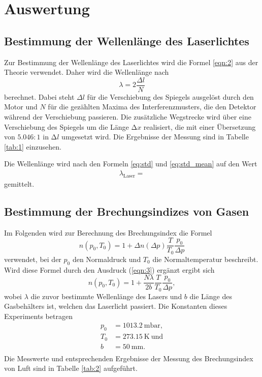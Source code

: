 \section{Auswertung}
\label{sec:Auswertung}

\subsection{Bestimmung der Wellenlänge des Laserlichtes}

Zur Bestimmung der Wellenlänge des Laserlichtes wird die Formel \ref{eqn:2} aus der Theorie verwendet.
Daher wird die Wellenlänge nach
\begin{equation}
  \lambda = 2\frac{\Delta l}{N}
\end{equation}
berechnet.
Dabei steht $\Delta l$ für die Verschiebung des Spiegels ausgelöst durch den Motor und $N$ für die gezählten Maxima des Interferenzmusters, die den Detektor während der Verschiebung passieren.
Die zusätzliche Wegstrecke wird über eine Verschiebung des Spiegels um die Länge $\increment{x}$ realisiert, die mit einer Übersetzung von $5.046:1$ in $\increment{l}$ umgesetzt wird.
Die Ergebnisse der Messung sind in Tabelle \ref{tab:1} einzusehen.



Die Wellenlänge wird nach den Formeln \eqref{eq:std} und \eqref{eq:std_mean} auf den Wert
\begin{align*}
  \lambda_{\text{Laser}} = 
\end{align*}
gemittelt.

\subsection{Bestimmung der Brechungsindizes von Gasen}

Im Folgenden wird zur Berechnung des Brechungsindex die Formel
\begin{equation}
  n(p_0,T_0) = 1 +\Delta n(\Delta p) \frac{T}{T_0}\frac{p_0}{\Delta p}
\end{equation}
verwendet, bei der $p_0$ den Normaldruck und $T_0$ die Normaltemperatur beschreibt.
Wird diese Formel durch den Ausdruck (\ref{eqn:3}) ergänzt ergibt sich
\begin{equation}
  n(p_0,T_0) = 1 +\frac{N \lambda}{2b} \frac{T}{T_0}\frac{p_0}{\Delta p},
\end{equation}
wobei $\lambda$ die zuvor bestimmte Wellenlänge des Lasers und $b$ die Länge des Gasbehälters ist, welchen das Laserlicht passiert.
Die Konstanten dieses Experiments betragen
\begin{align*}
  p_0 &= \SI{1013,2}{\milli\bar},\\
  T_0 &= \SI{273,15}{\kelvin} \: \text{und}\\
  b   &= \SI{50}{\milli\metre}.\\
\end{align*}
Die Messwerte und entsprechenden Ergebnisse der Messung des Brechungsindex von Luft sind in Tabelle \ref{tab:2} aufgeführt.


